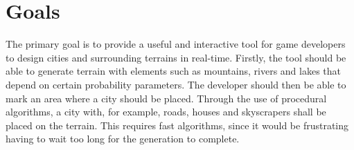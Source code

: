 \section{Goals}
\begin{comment}

\textcolor{red}{
Det här avsnittet är ofta den viktigaste delen av planeringsrapporten (och av den slutgiltiga uppsatsen/rapporten). Den syftar till att identifiera frågan/frågorna som ska tas upp i projektet. Det är viktigt att gruppen gör en problemanalys även om det i projektförslaget redan finns ett problem (en uppgift) specificerat. Anledningen till detta är att det riktiga primära problemet ofta skiljer sig från det i början av uppdragsgivaren/förslagsställaren/kunden föreslagna. Problemanalysen syftar också till att bryta ner problemet/uppgiften i mindre och mer detaljerade delproblem/deluppgifter, vilket också leder till formulering av delsyften. Genom att göra detta får studenterna mycket bättre förståelse för de olika aspekterna av problemet/uppgiften. Utan den här informationen är det omöjligt att identifiera vilken information som behövs, vilka informationskällor som behövs och lämpliga tillvägagångssätt.

En bra problemanalys som identifierar delproblem/deluppgifter och delsyften vilar i många fall på användning av teorier och modeller från litteraturen. En litteraturgenomgång bör därför genomföras tidigt i processen.
}

\textcolor{blue}{
\textbf{Projektmål (syfte, egenskaper, funktionalitet, etc)}
\begin{itemize}
    \item “Fungerande” stad
    \item Logiskt (e.g. vägnät)
    \item Använder oss utav PCG
    \item Algoritmer för olika typer av städer
    \item Interaktion med staden %
\end{itemize}
\textbf{Effektmål (nytta, vad det ska leda till)}
\begin{itemize}
    \item Grund till spel för indie-utvecklare
    \item Insikter om att använda PCG i spel
\end{itemize}
}
\end{comment}

The primary goal is to provide a useful and interactive tool for game developers to design cities and surrounding terrains in real-time. Firstly, the tool should be able to generate terrain with elements such as mountains, rivers and lakes that depend on certain probability parameters. The developer should then be able to mark an area where a city should be placed. Through the use of procedural algorithms, a city with, for example, roads, houses and skyscrapers shall be placed on the terrain. This requires fast algorithms, since it would be frustrating having to wait too long for the generation to complete.

